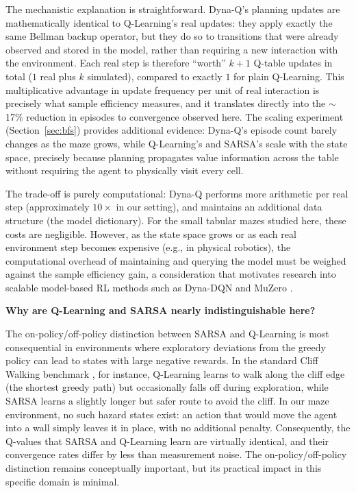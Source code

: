 \documentclass[11pt]{article}
\begin{document}
The mechanistic explanation is straightforward. Dyna-Q's planning updates
are mathematically identical to Q-Learning's real updates: they apply
exactly the same Bellman backup operator, but they do so to transitions
that were already observed and stored in the model, rather than requiring
a new interaction with the environment. Each real step is therefore
``worth'' $k + 1$ Q-table updates in total ($1$ real plus $k$ simulated),
compared to exactly $1$ for plain Q-Learning. This multiplicative
advantage in update frequency per unit of real interaction is precisely
what sample efficiency measures, and it translates directly into the
$\sim$17\% reduction in episodes to convergence observed here. The scaling
experiment (Section~\ref{sec:bfs}) provides additional evidence: Dyna-Q's
episode count barely changes as the maze grows, while Q-Learning's and
SARSA's scale with the state space, precisely because planning
propagates value information across the table without requiring the agent
to physically visit every cell.

The trade-off is purely computational: Dyna-Q performs more arithmetic
per real step (approximately $10\times$ in our setting), and maintains an
additional data structure (the model dictionary). For the small tabular
mazes studied here, these costs are negligible. However, as the state
space grows or as each real environment step becomes expensive (e.g., in
physical robotics), the computational overhead of maintaining and querying
the model must be weighed against the sample efficiency gain, a
consideration that motivates research into scalable model-based RL methods
such as Dyna-DQN \cite{ha2018} and MuZero \cite{schrittwieser2020}.

\textbf{Why are Q-Learning and SARSA nearly indistinguishable here?}

The on-policy/off-policy distinction between SARSA and Q-Learning is most
consequential in environments where exploratory deviations from the
greedy policy can lead to states with large negative rewards. In the
standard Cliff Walking benchmark \cite{sutton2018}, for instance, Q-Learning
learns to walk along the cliff edge (the shortest greedy path) but
occasionally falls off during exploration, while SARSA learns a slightly
longer but safer route to avoid the cliff. In our maze environment, no
such hazard states exist: an action that would move the agent into a wall
simply leaves it in place, with no additional penalty. Consequently, the
Q-values that SARSA and Q-Learning learn are virtually identical, and
their convergence rates differ by less than measurement noise. The
on-policy/off-policy distinction remains conceptually important, but its
practical impact in this specific domain is minimal.
\end{document}
